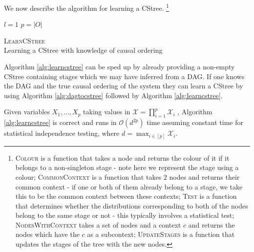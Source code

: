 \documentclass{tufte-book}
\begin{document}
\begin{Definition}
 \newpage 
We now describe the algorithm for learning a CStree.  \footnote{\textsc{Colour} is a function that takes a node and returns the colour of it if it belongs to a non-singleton stage - note here we represent the stage using a colour; \textsc{CommonContext} is a function that takes 2 nodes and returns their common context - if one or both of them already belong to a stage, we take this to be the common context between these contexts; \textsc{Test} is a function that determines whether the distributions corresponding to both of the nodes belong to the same stage or not - this typically involves a statistical test; \textsc{NodesWithContext} takes a set of nodes and a context $c$ and returns the nodes which have the $c$ as a subcontext; \textsc{UpdateStages} is a function that updates the stages of the tree with the new nodes.} 

\begin{algorithm}[H]\label{alg:learncstree}
\SetAlgoLined
{}
$l=1$\;
$p=|O|$\;
\caption{\textsc{LearnCStree} \\ Learning a CStree with knowledge of causal ordering}
\end{algorithm}

Algorithm \ref{alg:learncstree} can be sped up by already providing a non-empty CStree containing stages which we may have inferred from a DAG. If one knows the DAG and the true causal ordering of the system they can learn a CStree by using Algorithm \ref{alg:dagtocstree} followed by Algorithm \ref{alg:learncstree}.


\begin{theorem}\label{thm:learncstreecorrectness}
Given variables $X_1,...,X_p$ taking values in $\mathcal{X}=\prod_{i=1}^p \mathcal{X}_i$ , Algorithm \ref{alg:learncstree} is correct and runs in $\mathcal{O}(d^{2p})$ time assuming constant time for statistical independence testing, where $d=\max_{i \in [p]}\mathcal{X}_i$.


\end{theorem}
\end{Definition}
\end{document}
